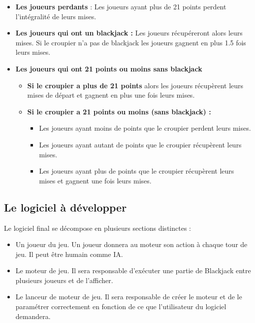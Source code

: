 \documentclass{article}
\begin{document}
\begin{itemize}
    \begin{itemize}\itshape
        \item \textbf{Les joueurs perdants} : Les joueurs ayant plus de 21 points perdent l'intégralité de leurs mises.

        \item \textbf{Les joueurs qui ont un blackjack :}
        Les joueurs récupéreront alors leurs mises. Si le croupier n'a pas de blackjack les joueurs gagnent en plus 1.5 fois leurs mises.
        
        \item \textbf{Les joueurs qui ont 21 points ou moins sans blackjack} 
        \begin{itemize}\itshape
            \item \textbf{Si le croupier a plus de 21 points} alors les joueurs récupèrent leurs mises de départ et gagnent en plus une fois leurs mises.
            \item \textbf{Si le croupier a 21 points ou moins (sans blackjack) :}
                \begin{itemize}
                \item Les joueurs ayant moins de points que le croupier perdent leurs mises.
                \item Les joueurs ayant autant de points que le croupier récupèrent leurs mises.
                \item Les joueurs ayant plus de points que le croupier récupèrent leurs mises et gagnent une fois leurs mises.
                \end{itemize}
        \end{itemize}
    \end{itemize}
\end{itemize}
\bigskip

\subsection{Le logiciel à développer}

Le logiciel final se décompose en plusieurs sections distinctes : 
\begin{itemize}
    \item Un joueur du jeu. Un joueur donnera au moteur son action à chaque tour de jeu. Il peut être humain comme IA.
    \item Le moteur de jeu. Il sera responsable d'exécuter une partie de Blackjack entre plusieurs joueurs et de l'afficher.
    \item Le lanceur de moteur de jeu. Il sera responsable de créer le moteur et de le paramétrer correctement en fonction de ce que l'utilisateur du logiciel demandera.
\end{itemize}
\end{document}
